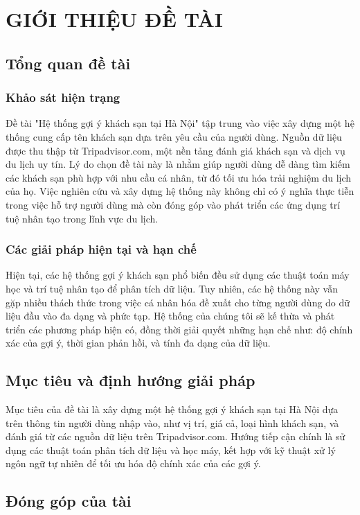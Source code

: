 \chapter {GIỚI THIỆU ĐỀ TÀI} 

\section{Tổng quan đề tài}
\subsection* {Khảo sát hiện trạng}
\label{sec:dvd}

Đề tài "Hệ thống gợi ý khách sạn tại Hà Nội" tập trung vào việc xây dựng một hệ thống cung cấp tên khách sạn dựa trên yêu cầu của người dùng. Nguồn dữ liệu được thu thập từ Tripadvisor.com, một nền tảng đánh giá khách sạn và dịch vụ du lịch uy tín. Lý do chọn đề tài này là nhằm giúp người dùng dễ dàng tìm kiếm các khách sạn phù hợp với nhu cầu cá nhân, từ đó tối ưu hóa trải nghiệm du lịch của họ. Việc nghiên cứu và xây dựng hệ thống này không chỉ có ý nghĩa thực tiễn trong việc hỗ trợ người dùng mà còn đóng góp vào phát triển các ứng dụng trí tuệ nhân tạo trong lĩnh vực du lịch.


\subsection*{Các giải pháp hiện tại và hạn chế}
\label{sec:giaiphap}
Hiện tại, các hệ thống gợi ý khách sạn phổ biến đều sử dụng các thuật toán máy học và trí tuệ nhân tạo để phân tích dữ liệu. Tuy nhiên, các hệ thống này vẫn gặp nhiều thách thức trong việc cá nhân hóa đề xuất cho từng người dùng do dữ liệu đầu vào đa dạng và phức tạp. Hệ thống của chúng tôi sẽ kế thừa và phát triển các phương pháp hiện có, đồng thời giải quyết những hạn chế như: độ chính xác của gợi ý, thời gian phản hồi, và tính đa dạng của dữ liệu.
\section{Mục tiêu và định hướng giải pháp}
Mục tiêu của đề tài là xây dựng một hệ thống gợi ý khách sạn tại Hà Nội dựa trên thông tin người dùng nhập vào, như vị trí, giá cả, loại hình khách sạn, và đánh giá từ các nguồn dữ liệu trên Tripadvisor.com. Hướng tiếp cận chính là sử dụng các thuật toán phân tích dữ liệu và học máy, kết hợp với kỹ thuật xử lý ngôn ngữ tự nhiên để tối ưu hóa độ chính xác của các gợi ý. 

\section{Đóng góp của tài}

